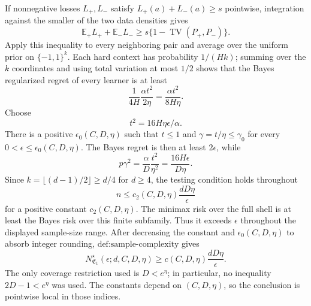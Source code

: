 If nonnegative losses \(L_+,L_-\) satisfy \(L_+(a)+L_-(a)\ge s\) pointwise, integration against the smaller of the two data densities gives
\[
\mathbb E_+L_++\mathbb E_-L_-
\ge s\{1-\operatorname{TV}(P_+,P_-)\}.
\]
Apply this inequality to every neighboring pair and average over the uniform prior on \(\{-1,1\}^k\). Each hard context has probability \(1/(Hk)\); summing over the \(k\) coordinates and using total variation at most \(1/2\) shows that the Bayes regularized regret of every learner is at least
\[
\frac{1}{4H}\frac{\alpha t^2}{2\eta}
=\frac{\alpha t^2}{8H\eta}.
\]
Choose
\[
t^2=16H\eta\epsilon/\alpha.
\]
There is a positive \(\epsilon_0(C,D,\eta)\) such that \(t\le1\) and \(\gamma=t/\eta\le\gamma_0\) for every \(0<\epsilon\le\epsilon_0(C,D,\eta)\). The Bayes regret is then at least \(2\epsilon\), while
\[
p\gamma^2
=\frac{\alpha}{D}\frac{t^2}{\eta^2}
=\frac{16H\epsilon}{D\eta}.
\]
Since \(k=\lfloor(d-1)/2\rfloor\ge d/4\) for \(d\ge4\), the testing condition holds throughout
\[
n\le c_2(C,D,\eta)\frac{dD\eta}{\epsilon}
\]
for a positive constant \(c_2(C,D,\eta)\). The minimax risk over the full shell is at least the Bayes risk over this finite subfamily. Thus it exceeds \(\epsilon\) throughout the displayed sample-size range. After decreasing the constant and \(\epsilon_0(C,D,\eta)\) to absorb integer rounding, \(\text{def:sample-complexity}\) gives
\[
N^\star_{\mathfrak E_1}(\epsilon;d,C,D,\eta)
\ge c(C,D,\eta)\frac{dD\eta}{\epsilon}.
\]
The only coverage restriction used is \(D<e^\eta\); in particular, no inequality \(2D-1<e^\eta\) was used. The constants depend on \((C,D,\eta)\), so the conclusion is pointwise local in those indices.